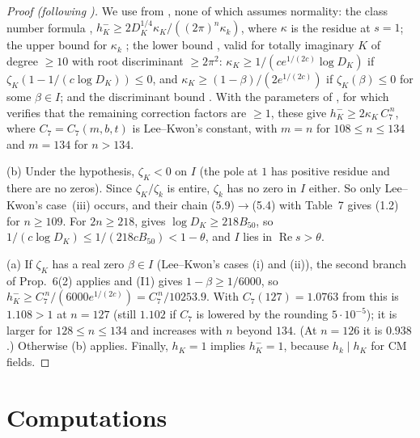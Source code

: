 \documentclass[11pt]{amsart}
\theoremstyle{definition}
\theoremstyle{remark}
\begin{document}
\begin{proof}[Proof (following {\cite[\S\S3--6]{LK}})]
We use from \cite{LK}, none of which assumes normality: the class number formula \cite[(1.4)]{LK},
$h^-_K\ge2D_K^{1/4}\kappa_K/((2\pi)^n\kappa_k)$, where $\kappa$ is the residue at $s=1$; the upper bound for $\kappa_k$
\cite[Prop.~5]{LK}; the lower bound \cite[Prop.~6(2)]{LK}, valid for totally imaginary $K$ of degree $\ge10$ with root
discriminant $\ge2\pi^2$: $\kappa_K\ge1/(ce^{1/(2c)}\log D_K)$ if $\zeta_K(1-1/(c\log D_K))\le0$, and
$\kappa_K\ge(1-\beta)/(2e^{1/(2c)})$ if $\zeta_K(\beta)\le0$ for some $\beta\in I$; and the discriminant bound
\cite[Lemma~7]{LK}. With the parameters of \cite[Table~7]{LK}, for which \cite[\S6.2]{LK} verifies that the remaining
correction factors are $\ge1$, these give $h^-_K\ge2\kappa_K\,C_7^{\,n}$, where $C_7=C_7(m,b,t)$ is Lee--Kwon's constant,
with $m=n$ for $108\le n\le134$ and $m=134$ for $n>134$.

(b) Under the hypothesis, $\zeta_K<0$ on $I$ (the pole at $1$ has positive residue and there are no zeros). Since
$\zeta_K/\zeta_k$ is entire, $\zeta_k$ has no zero in $I$ either. So only Lee--Kwon's case~(iii) occurs, and their chain
(5.9)$\to$(5.4) with Table~7 gives (1.2) for $n\ge109$. For $2n\ge218$, \cite[Lemma~7(1)]{LK} gives $\log D_K\ge
218B_{50}$, so $1/(c\log D_K)\le1/(218cB_{50})<1-\theta$, and $I$ lies in $\operatorname{Re}s>\theta$.

(a) If $\zeta_K$ has a real zero $\beta\in I$ (Lee--Kwon's cases (i) and (ii)), the second branch of Prop.~6(2) applies
and (I1) gives $1-\beta\ge1/6000$, so $h^-_K\ge C_7^{\,n}/(6000e^{1/(2c)})=C_7^{\,n}/10253.9$. With $C_7(127)=1.0763$
from \cite[Table~7]{LK} this is $1.108>1$ at $n=127$ (still $1.102$ if $C_7$ is lowered by the rounding
$5\cdot10^{-5}$); it is larger for $128\le n\le134$ and increases with $n$ beyond $134$. (At $n=126$ it is $0.938$.)
Otherwise (b) applies. Finally, $h_K=1$ implies $h^-_K=1$, because $h_k\mid h_K$ for CM fields.
\end{proof}

\section{Computations}\label{sec:computations}
\end{document}
